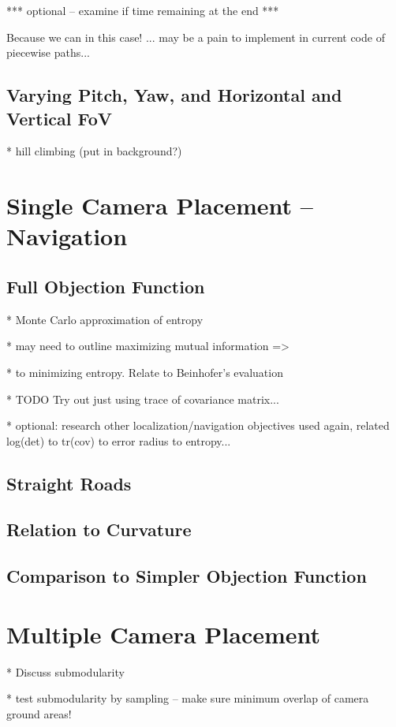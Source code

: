 \documentclass[a4paper,12pt,twoside,openright]{report}
\begin{document}
*** optional -- examine if time remaining at the end ***

Because we can in this case! ... may be a pain to implement in current code of piecewise paths...

\subsection{Varying Pitch, Yaw, and Horizontal and Vertical FoV}

* hill climbing (put in background?)


\section{Single Camera Placement -- Navigation}

\subsection{Full Objection Function}
* Monte Carlo approximation of entropy

* may need to outline maximizing mutual information =>

* to minimizing entropy. Relate to Beinhofer's evaluation

* TODO Try out just using trace of covariance matrix...

* optional: research other localization/navigation objectives used again, related log(det) to tr(cov) to error radius to entropy...
\subsection{Straight Roads}

\subsection{Relation to Curvature}

\subsection{Comparison to Simpler Objection Function}



\section{Multiple Camera Placement}
* Discuss submodularity

* test submodularity by sampling -- make sure minimum overlap of camera ground areas!
\end{document}
